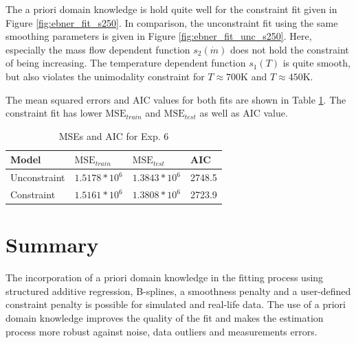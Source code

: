 \documentclass[10pt,a4paper]{article}
\begin{document}
The a priori domain knowledge is hold quite well for the constraint fit given in Figure \ref{fig:ebner_fit_s250}. In comparison, the unconstraint fit using the same smoothing parameters is given in Figure \ref{fig:ebner_fit_unc_s250}. Here, especially the mass flow dependent function $s_2(\dot m)$ does not hold the constraint of being increasing. The temperature dependent function $s_1(T)$ is quite smooth, but also violates the unimodality constraint for $T \approx 700 \text{K}$ and $T \approx 450 \text{K}$. 

The mean squared errors and AIC values for both fits are shown in Table \ref{tab:metrics_6}. The constraint fit has lower $\text{MSE}_{train}$ and $\text{MSE}_{test}$ as well as AIC value. 


\begin{table}[H]
	\centering
	\begin{tabular}{|l|l|l|l|}
		\hline
		\textbf{Model} & \textbf{$\text{MSE}_{train}$} & \textbf{$\text{MSE}_{test}$}  & \textbf{AIC} \\ \hline \toprule
		Unconstraint  & $1.5178 * 10^{6}$  & $1.3843 * 10^{6}$ & 2748.5      \\ \hline
		Constraint    & $1.5161 * 10^{6}$  & $1.3808 * 10^{6}$ & 2723.9      \\ \hline
	\end{tabular}
	\caption{MSEs and AIC for Exp. 6}
	\label{tab:metrics_6}
\end{table}


\section{Summary}

The incorporation of a priori domain knowledge in the fitting process using structured additive regression, B-splines, a smoothness penalty and a user-defined constraint penalty is possible for simulated and real-life data. The use of a priori domain knowledge improves the quality of the fit and makes the estimation process more robust against noise, data outliers and measurements errors. 
\end{document}
